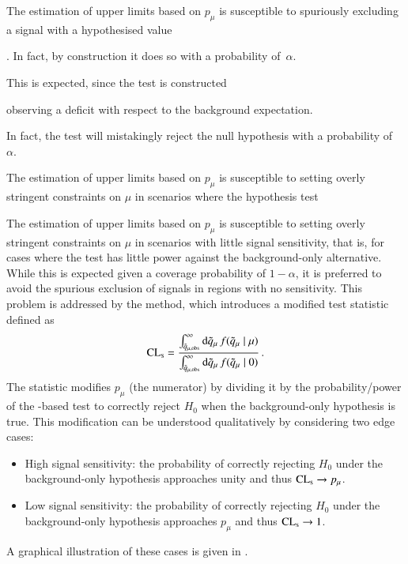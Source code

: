 The estimation of upper limits based on $p_\mu$ is susceptible to spuriously
excluding a signal with a hypothesised value


. In fact, by construction it does
so with a probability of~$\alpha$.






This is expected, since the test is constructed







observing a deficit with respect to the background expectation.



In fact, the test
will mistakingly reject the null hypothesis with a probability of~$\alpha$.





The estimation of upper limits based on $p_\mu$ is
susceptible to setting overly stringent constraints on $\mu$ in scenarios where
the hypothesis test












The estimation of upper limits based on $p_\mu$ is susceptible to setting overly
stringent constraints on $\mu$ in scenarios with little signal sensitivity, that
is, for cases where the test has little power against the background-only
alternative.
While this is expected given a coverage
probability of $1 - \alpha$, it is preferred to avoid the spurious exclusion of
signals in regions with no sensitivity. This problem is addressed by the \CLs
method, which introduces a modified test statistic defined
as~\cite{Cowan:2010js}
\begin{align}
  \text{CL}_{\text{s}} = \frac
  {\int_{\tilde{q}_{\mu, \text{obs}}}^{\infty} \mathrm{d}\tilde{q}_{\mu} \, f(\tilde{q}_{\mu} \mid \mu)}
  {\int_{\tilde{q}_{\mu, \text{obs}}}^\infty \mathrm{d}\tilde{q}_{\mu} \, f(\tilde{q}_{\mu} \mid 0)} \,\text{.}
  \label{eq:cls}
\end{align}
The \CLs statistic modifies $p_\mu$ (the numerator) by dividing it by the
probability/power of the \qmutilde-based test to correctly reject $H_0$ when the
background-only hypothesis is true. This modification can be understood
qualitatively by considering two edge cases:
\begin{itemize}

\item High signal sensitivity: the probability of correctly rejecting $H_0$
  under the background-only hypothesis approaches unity and thus
  $\text{CL}_{\text{s}} \rightarrow p_\mu$.

\item Low signal sensitivity: the probability of correctly rejecting $H_0$ under
  the background-only hypothesis approaches $p_\mu$ and thus $\text{CL}_{\text{s}} \rightarrow 1$.

\end{itemize}
A graphical illustration of these cases is given in .

